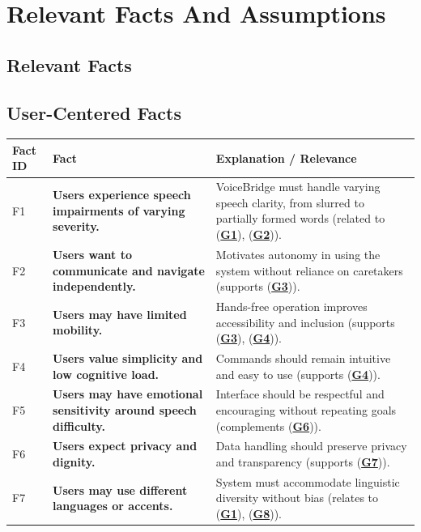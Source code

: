 \documentclass[12pt]{article}
\begin{document}
\section{Relevant Facts And Assumptions}
\subsection{Relevant Facts}

\subsection{User-Centered Facts}
\begin{table}[H]
\centering
\begin{tabularx}{\textwidth}{p{1cm}p{6cm}X}
\toprule {\textbf{Fact ID}} & {\textbf{Fact}} & {\textbf{Explanation / Relevance}}\\
\midrule
F1 & \textbf{Users experience speech impairments of varying severity.} & VoiceBridge must handle varying speech clarity, from slurred to partially formed words (related to (\textbf{\hyperref[tab:project-goals]{G1}}), (\textbf{\hyperref[tab:project-goals]{G2}})). \\ \hline
F2 & \textbf{Users want to communicate and navigate independently.} & Motivates autonomy in using the system without reliance on caretakers (supports (\textbf{\hyperref[tab:project-goals]{G3}})). \\ \hline
F3 & \textbf{Users may have limited mobility.} & Hands-free operation improves accessibility and inclusion (supports (\textbf{\hyperref[tab:project-goals]{G3}}), (\textbf{\hyperref[tab:project-goals]{G4}})). \\ \hline
F4 & \textbf{Users value simplicity and low cognitive load.} & Commands should remain intuitive and easy to use (supports (\textbf{\hyperref[tab:project-goals]{G4}})). \\ \hline
F5 & \textbf{Users may have emotional sensitivity around speech difficulty.} & Interface should be respectful and encouraging without repeating goals (complements (\textbf{\hyperref[tab:project-goals]{G6}})). \\ \hline
F6 & \textbf{Users expect privacy and dignity.} & Data handling should preserve privacy and transparency (supports (\textbf{\hyperref[tab:project-goals]{G7}})). \\ \hline
F7 & \textbf{Users may use different languages or accents.} & System must accommodate linguistic diversity without bias (relates to (\textbf{\hyperref[tab:project-goals]{G1}}), (\textbf{\hyperref[tab:project-goals]{G8}})). \\ \hline

\end{tabularx}
\end{table}
\end{document}
